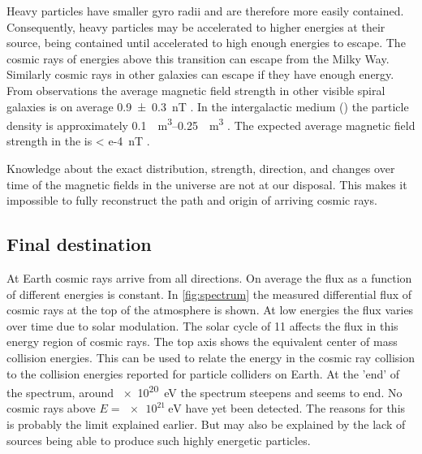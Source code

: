 Heavy particles have smaller gyro radii and are therefore more easily contained. Consequently, heavy particles may be accelerated to higher energies at their source, being contained until accelerated to high enough energies to escape. The cosmic rays of energies above this transition can escape from the Milky Way. Similarly cosmic rays in other galaxies can escape if they have enough energy. From observations the average magnetic field strength in other visible spiral galaxies is on average \SI{0.9 \pm 0.3}{\nano\tesla} \cite{jansson2010magnetic}. In the intergalactic medium (\igm) the particle density is approximately \SIrange{0.1}{0.25}{\per\meter\cubed} \cite{copi1995igm}. The expected average magnetic field strength in the \igm is \SI{< e-4}{\nano\tesla} \cite{kronberg1994igm}.

Knowledge about the exact distribution, strength, direction, and changes over time of the magnetic fields in the universe are not at our disposal. This makes it impossible to fully reconstruct the path and origin of arriving cosmic rays.


\subsection{Final destination}

At Earth cosmic rays arrive from all directions. On average the flux as a function of different energies is constant. In \cref{fig:spectrum} the measured differential flux of cosmic rays at the top of the atmosphere is shown. At low energies the flux varies over time due to solar modulation. The solar cycle of \SI{11}{\year} affects the flux in this energy region of cosmic rays. The top axis shows the equivalent center of mass collision energies. This can be used to relate the energy in the cosmic ray collision to the collision energies reported for particle colliders on Earth. At the 'end' of the spectrum, around \SI{e20}{\eV} the spectrum steepens and seems to end. No cosmic rays above $E = \SI{e21}{\eV}$ have yet been detected. The reasons for this is probably the \gzk limit explained earlier. But may also be explained by the lack of sources being able to produce such highly energetic particles.

